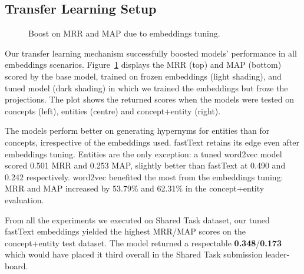 \subsection{Transfer Learning Setup}
\begin{figure}[!ht]
    \centering
    \qquad
    \caption{Boost on MRR and MAP due to embeddings tuning.}        
    \label{fig:embeddings_boost}
\end{figure}
Our transfer learning mechanism successfully boosted models' performance in all embeddings scenarios.  Figure~\ref{fig:embeddings_boost} displays the \ac{MRR} (top) and \ac{MAP} (bottom) scored by the base model, trained on frozen embeddings (light shading), and tuned model (dark shading) in which we trained the embeddings but froze the projections.  The plot shows the returned scores when the models were tested on concepts (left), entities (centre) and concept+entity (right).

The models perform better on generating hypernyms for entities than for concepts, irrespective of the embeddings used.  fastText retains its edge even after embeddings tuning.  Entities are the only exception: a tuned word2vec model scored 0.501 \ac{MRR} and 0.253 \ac{MAP}, slightly better than fastText at 0.490 and 0.242 respectively.  word2vec benefited the most from the embeddings tuning: \ac{MRR} and \ac{MAP} increased by 53.79\% and 62.31\% in the concept+entity evaluation. 

From all the experiments we executed on Shared Task dataset, our tuned fastText embeddings yielded the highest MRR/MAP scores on the concept+entity test dataset.  The model returned a respectable \textbf{0.348}/\textbf{0.173} which would have placed it third overall in the Shared Task submission leader-board.